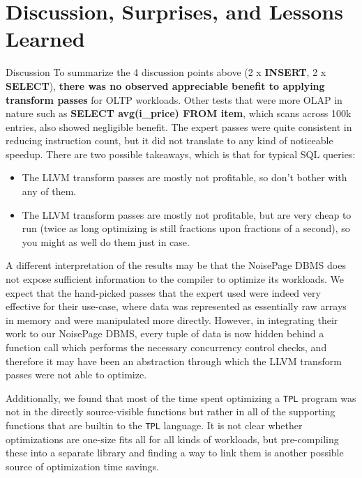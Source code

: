 \documentclass{vldb}
\newcommand{\tpl}{\texttt{TPL}\xspace}
\newcommand{\dbCode}[1]{{\sffamily\small \textbf{#1}}\xspace}
\begin{document}
\section{Discussion, Surprises, and Lessons Learned}

Discussion To summarize the 4 discussion points above (2 x \dbCode{INSERT}, 2 x \dbCode{SELECT}), \textbf{there was no observed appreciable benefit to applying transform passes} for OLTP workloads. Other tests that were more OLAP in nature such as \dbCode{SELECT avg(i\_price) FROM item}, which scans across 100k entries, also showed negligible benefit. The expert passes were quite consistent in reducing instruction count, but it did not translate to any kind of noticeable speedup. There are two possible takeaways, which is that for typical SQL queries:
\begin{itemize}
    \item The LLVM transform passes are mostly not profitable, so don't bother with any of them.
    \item The LLVM transform passes are mostly not profitable, but are very cheap to run (twice as long optimizing is still fractions upon fractions of a second), so you might as well do them just in case.
\end{itemize}

A different interpretation of the results may be that the NoisePage DBMS does not expose sufficient information to the compiler to optimize its workloads. We expect that the hand-picked passes that the expert used were indeed very effective for their use-case, where data was represented as essentially raw arrays in memory and were manipulated more directly. However, in integrating their work to our NoisePage DBMS, every tuple of data is now hidden behind a function call which performs the necessary concurrency control checks, and therefore it may have been an abstraction through which the LLVM transform passes were not able to optimize.

Additionally, we found that most of the time spent optimizing a \tpl program was not in the directly source-visible functions but rather in all of the supporting functions that are builtin to the \tpl language. It is not clear whether optimizations are one-size fits all for all kinds of workloads, but pre-compiling these into a separate library and finding a way to link them is another possible source of optimization time savings.
\end{document}
